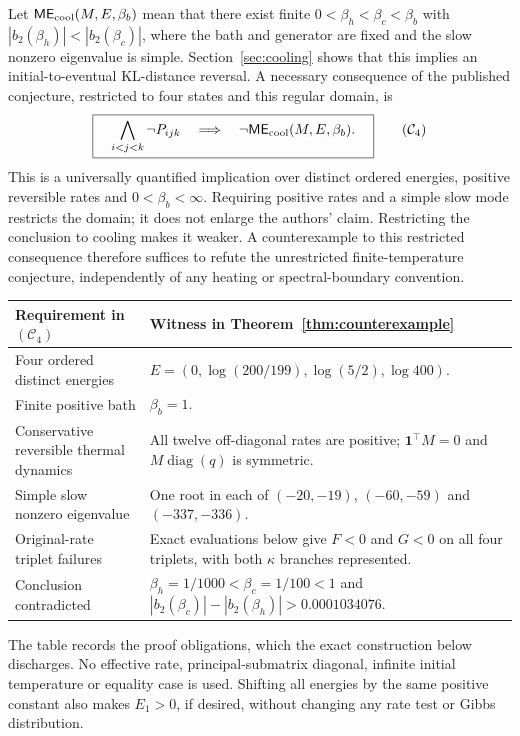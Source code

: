 \documentclass[11pt]{article}
\newcommand{\diag}{\operatorname{diag}}
\begin{document}
Let $\mathsf{ME}_{\rm cool}(M,E,\beta_b)$ mean that there exist finite $0<\beta_h<\beta_c<\beta_b$ with $|b_2(\beta_h)|<|b_2(\beta_c)|$, where the bath and generator are fixed and the slow nonzero eigenvalue is simple. Section~\ref{sec:cooling} shows that this implies an initial-to-eventual KL-distance reversal. A necessary consequence of the published conjecture, restricted to four states and this regular domain, is
\begin{equation}\label{eq:claimC4}
\boxed{\quad
\bigwedge_{i<j<k}\neg P_{ijk}
\quad\Longrightarrow\quad
\neg\mathsf{ME}_{\rm cool}(M,E,\beta_b).
\quad}\tag{$\mathcal C_4$}
\end{equation}
This is a universally quantified implication over distinct ordered energies, positive reversible rates and $0<\beta_b<\infty$. Requiring positive rates and a simple slow mode restricts the domain; it does not enlarge the authors' claim. Restricting the conclusion to cooling makes it weaker. A counterexample to this restricted consequence therefore suffices to refute the unrestricted finite-temperature conjecture, independently of any heating or spectral-boundary convention.

\begin{center}\small
\begin{tabular}{p{}p{}}
\toprule Requirement in $(\mathcal C_4)$&Witness in Theorem~\ref{thm:counterexample}\\\midrule
Four ordered distinct energies&$E=(0,\log(200/199),\log(5/2),\log400)$.\\
Finite positive bath&$\beta_b=1$.\\
Conservative reversible thermal dynamics&All twelve off-diagonal rates are positive; $\mathbf1^\top M=0$ and $M\diag(q)$ is symmetric.\\
Simple slow nonzero eigenvalue&One root in each of $(-20,-19)$, $(-60,-59)$ and $(-337,-336)$.\\
Original-rate triplet failures&Exact evaluations below give $F<0$ and $G<0$ on all four triplets, with both $\kappa$ branches represented.\\
Conclusion contradicted&$\beta_h=1/1000<\beta_c=1/100<1$ and $|b_2(\beta_c)|-|b_2(\beta_h)|>0.0001034076$.\\\bottomrule
\end{tabular}
\end{center}
The table records the proof obligations, which the exact construction below discharges. No effective rate, principal-submatrix diagonal, infinite initial temperature or equality case is used. Shifting all energies by the same positive constant also makes $E_1>0$, if desired, without changing any rate test or Gibbs distribution.
\end{document}
